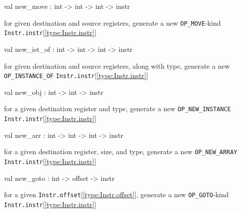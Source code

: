 \documentclass[11pt]{article}
\begin{document}
\label{val:Instr.new-underscoremove}\begin{ocamldoccode}
val new_move : int -> int -> int -> instr
\end{ocamldoccode}
\begin{ocamldocdescription}
for given destination and source registers,
 generate a new {\tt{OP\_MOVE}}-kind {\tt{Instr.instr}}[\ref{type:Instr.instr}]


\end{ocamldocdescription}




\label{val:Instr.new-underscoreist-underscoreof}\begin{ocamldoccode}
val new_ist_of : int -> int -> int -> instr
\end{ocamldoccode}
\begin{ocamldocdescription}
for given destination and source registers, along with type,
 generate a new {\tt{OP\_INSTANCE\_OF}} {\tt{Instr.instr}}[\ref{type:Instr.instr}]


\end{ocamldocdescription}




\label{val:Instr.new-underscoreobj}\begin{ocamldoccode}
val new_obj : int -> int -> instr
\end{ocamldoccode}
\begin{ocamldocdescription}
for a given destination register and type,
 generate a new {\tt{OP\_NEW\_INSTANCE}} {\tt{Instr.instr}}[\ref{type:Instr.instr}]


\end{ocamldocdescription}




\label{val:Instr.new-underscorearr}\begin{ocamldoccode}
val new_arr : int -> int -> int -> instr
\end{ocamldoccode}
\begin{ocamldocdescription}
for a given destination register, size, and type,
 generate a new {\tt{OP\_NEW\_ARRAY}} {\tt{Instr.instr}}[\ref{type:Instr.instr}]


\end{ocamldocdescription}




\label{val:Instr.new-underscoregoto}\begin{ocamldoccode}
val new_goto : int -> offset -> instr
\end{ocamldoccode}
\begin{ocamldocdescription}
for a given {\tt{Instr.offset}}[\ref{type:Instr.offset}],
 generate a new {\tt{OP\_GOTO}}-kind {\tt{Instr.instr}}[\ref{type:Instr.instr}]


\end{ocamldocdescription}
\end{document}
